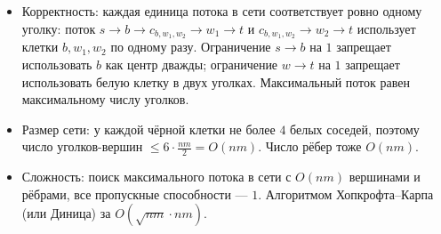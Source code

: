 \begin{enumerate}
\begin{itemize}
      \item Корректность: каждая единица потока в сети соответствует ровно одному уголку:
      поток $s \to b \to c_{b,w_1,w_2} \to w_1 \to t$ и $c_{b,w_1,w_2} \to w_2 \to t$ использует клетки $b, w_1, w_2$ по одному разу.
      Ограничение $s \to b$ на $1$ запрещает использовать $b$ как центр дважды;
      ограничение $w \to t$ на $1$ запрещает использовать белую клетку в двух уголках.
      Максимальный поток равен максимальному числу уголков.

      \item Размер сети: у каждой чёрной клетки не более $4$ белых соседей, поэтому число уголков-вершин $\le 6 \cdot \frac{nm}{2} = O(nm)$. Число рёбер тоже $O(nm)$.

      \item Сложность: поиск максимального потока в сети с $O(nm)$ вершинами и рёбрами, все пропускные способности --- $1$. Алгоритмом Хопкрофта--Карпа (или Диница) за $O(\sqrt{nm} \cdot nm)$.
    \end{itemize}

\end{enumerate}

